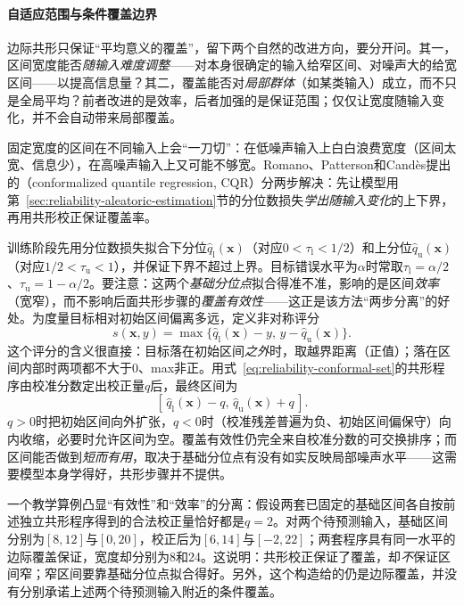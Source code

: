 \paragraph{自适应范围与条件覆盖边界}

边际共形只保证“平均意义的覆盖”，留下两个自然的改进方向，要分开问。其一，区间宽度能否\emph{随输入难度调整}——对本身很确定的输入给窄区间、对噪声大的给宽区间——以提高信息量？其二，覆盖能否对\emph{局部群体}（如某类输入）成立，而不只是全局平均？前者改进的是效率，后者加强的是保证范围；仅仅让宽度随输入变化，并不会自动带来局部覆盖。

固定宽度的区间在不同输入上会“一刀切”：在低噪声输入上白白浪费宽度（区间太宽、信息少），在高噪声输入上又可能不够宽。Romano、Patterson和Candès提出的（conformalized quantile regression, CQR）分两步解决：先让模型用第~\ref{sec:reliability-aleatoric-estimation}节的分位数损失\emph{学出随输入变化}的上下界，再用共形校正保证覆盖率。

训练阶段先用分位数损失拟合下分位$\hat q_{\mathrm l}(\bm{x})$（对应$0<\tau_{\mathrm l}<1/2$）和上分位$\hat q_{\mathrm u}(\bm{x})$（对应$1/2<\tau_{\mathrm u}<1$），并保证下界不超过上界。目标错误水平为$\alpha$时常取$\tau_{\mathrm l}=\alpha/2$、$\tau_{\mathrm u}=1-\alpha/2$。要注意：这两个\emph{基础分位点}拟合得准不准，影响的是区间\emph{效率}（宽窄），而不影响后面共形步骤的\emph{覆盖有效性}——这正是该方法“两步分离”的好处。为度量目标相对初始区间偏离多远，定义非对称评分
\begin{equation}
 s(\bm{x},y)
 =\max\{\hat q_{\mathrm l}(\bm{x})-y,\,
              y-\hat q_{\mathrm u}(\bm{x})\}.
 \label{eq:reliability-cqr-score}
\end{equation}
这个评分的含义很直接：目标落在初始区间\emph{之外}时，取越界距离（正值）；落在区间内部时两项都不大于0、max非正。用式~\eqref{eq:reliability-conformal-set}的共形程序由校准分数定出校正量$q$后，最终区间为
\[
 [\,\hat q_{\mathrm l}(\bm{x})-q,\,
       \hat q_{\mathrm u}(\bm{x})+q\,].
\]
$q>0$时把初始区间向外扩张，$q<0$时（校准残差普遍为负、初始区间偏保守）向内收缩，必要时允许区间为空。覆盖有效性仍完全来自校准分数的可交换排序；而区间能否做到\emph{短而有用}，取决于基础分位点有没有如实反映局部噪声水平——这需要模型本身学得好，共形步骤并不提供。

一个教学算例凸显“有效性”和“效率”的分离：假设两套已固定的基础区间各自按前述独立共形程序得到的合法校正量恰好都是$q=2$。对两个待预测输入，基础区间分别为$[8,12]$与$[0,20]$，校正后为$[6,14]$与$[-2,22]$；两套程序具有同一水平的边际覆盖保证，宽度却分别为8和24。这说明：共形校正保证了覆盖，却\emph{不}保证区间窄；窄区间要靠基础分位点拟合得好。另外，这个构造给的仍是边际覆盖，并没有分别承诺上述两个待预测输入附近的条件覆盖。

